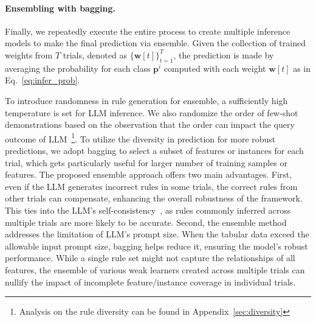 \documentclass{article}
\theoremstyle{plain}
\theoremstyle{definition}
\theoremstyle{remark}
\newcommand{\cutparagraphup}{\vspace*{-0.12in}}
\begin{document}



\cutparagraphup
\paragraph{Ensembling with bagging.}
Finally, we repeatedly execute the entire process to create multiple inference models to make the final prediction via ensemble. Given the collection of trained weights from $T$ trials, denoted as $\{\mathbf{w}[t]\}_{t=1}^T$, the prediction is made by averaging the probability for each class $\mathbf{p}^i$ computed with each weight $\mathbf{w}[t]$ as in Eq.~\ref{eq:infer_prob}.


To introduce randomness in rule generation for ensemble, a sufficiently high temperature is set for LLM inference. We also randomize the order of few-shot demonstrations based on the observation that the order can impact the query outcome of LLM~\cite{lu2022fantastically}\footnote{Analysis on the rule diversity can be found in Appendix~\ref{sec:diversity}}. To utilize the diversity in prediction for more robust predictions, we adopt bagging to select a subset of features or instances for each trial, which gets particularly useful for larger number of training samples or features. 
The proposed ensemble approach offers two main advantages. First, even if the LLM generates incorrect rules in some trials, the correct rules from other trials can compensate, enhancing the overall robustness of the framework. This ties into the LLM's self-consistency~\cite{wang2022self}, as rules commonly inferred across multiple trials are more likely to be accurate.  %
Second, the ensemble method addresses the limitation of LLM's prompt size. When the tabular data exceed the allowable input prompt size, bagging helps reduce it, ensuring the model's robust performance. While a single rule set might not capture the relationships of all features, the ensemble of various weak learners created across multiple trials can nullify the impact of incomplete feature/instance coverage in individual trials.
\end{document}
